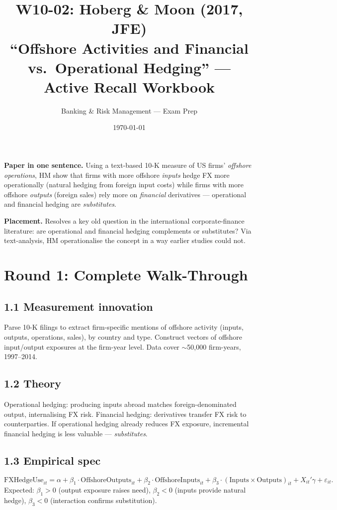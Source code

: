 \documentclass[11pt]{article}
\title{W10-02: Hoberg \& Moon (2017, JFE) \\
\large ``Offshore Activities and Financial vs.\ Operational Hedging'' --- Active Recall Workbook}
\author{Banking \& Risk Management --- Exam Prep}
\date{\today}
\begin{document}
\maketitle

\begin{keybox}
\textbf{Paper in one sentence.} Using a text-based 10-K measure of US firms' \emph{offshore operations}, HM show that firms with more offshore \emph{inputs} hedge FX more operationally (natural hedging from foreign input costs) while firms with more offshore \emph{outputs} (foreign sales) rely more on \emph{financial} derivatives --- operational and financial hedging are \emph{substitutes}.

\textbf{Placement.} Resolves a key old question in the international corporate-finance literature: are operational and financial hedging complements or substitutes? Via text-analysis, HM operationalise the concept in a way earlier studies could not.
\end{keybox}

\section*{Round 1: Complete Walk-Through}

\subsection*{1.1 Measurement innovation}
Parse 10-K filings to extract firm-specific mentions of offshore activity (inputs, outputs, operations, sales), by country and type. Construct vectors of offshore input/output exposures at the firm-year level. Data cover $\sim$50{,}000 firm-years, 1997--2014.

\subsection*{1.2 Theory}
Operational hedging: producing inputs abroad matches foreign-denominated output, internalising FX risk. Financial hedging: derivatives transfer FX risk to counterparties. If operational hedging already reduces FX exposure, incremental financial hedging is less valuable --- \emph{substitutes}.

\subsection*{1.3 Empirical spec}
\[
\text{FXHedgeUse}_{it}=\alpha+\beta_1\cdot\text{OffshoreOutputs}_{it}+\beta_2\cdot\text{OffshoreInputs}_{it}+\beta_3\cdot(\text{Inputs}\times\text{Outputs})_{it}+X_{it}'\gamma+\varepsilon_{it}.
\]
Expected: $\beta_1>0$ (output exposure raises need), $\beta_2<0$ (inputs provide natural hedge), $\beta_3<0$ (interaction confirms substitution).
\end{document}
